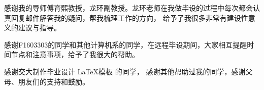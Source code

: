 
\begin{acknowledgements}
  感谢我的导师傅育熙教授，龙环副教授。龙环老师在我做毕设的过程中每次都会认真回复邮件解答我的疑问，帮我梳理工作的方向，
  给予了我很多非常有建设性意义的建议与指导。

  感谢F1603303的同学和其他计算机系的同学，在远程毕设期间，大家相互提醒时间节点和注意事项，给予了我很大的帮助。

  感谢交大制作毕业设计 \LaTeX 模板 \href{https://github.com/sjtug/SJTUThesis}{\sjtuthesis} 的同学，
  感谢其他帮助过我的同学，感谢父母、朋友们的支持和鼓励。
\end{acknowledgements}
